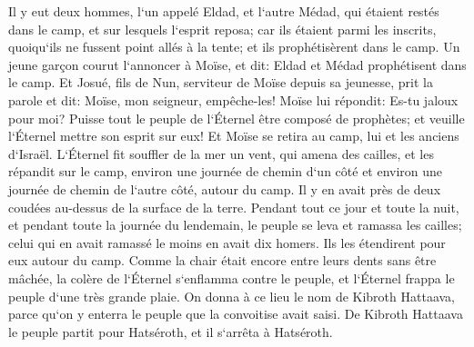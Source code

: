 \verse Il y eut deux hommes, l`un appelé Eldad, et l`autre Médad, qui étaient restés dans le camp, et sur lesquels l`esprit reposa; car ils étaient parmi les inscrits, quoiqu`ils ne fussent point allés à la tente; et ils prophétisèrent dans le camp. 
\verse Un jeune garçon courut l`annoncer à Moïse, et dit: Eldad et Médad prophétisent dans le camp. 
\verse Et Josué, fils de Nun, serviteur de Moïse depuis sa jeunesse, prit la parole et dit: Moïse, mon seigneur, empêche-les! 
\verse Moïse lui répondit: Es-tu jaloux pour moi? Puisse tout le peuple de l`Éternel être composé de prophètes; et veuille l`Éternel mettre son esprit sur eux! 
\verse Et Moïse se retira au camp, lui et les anciens d`Israël. 
\verse L`Éternel fit souffler de la mer un vent, qui amena des cailles, et les répandit sur le camp, environ une journée de chemin d`un côté et environ une journée de chemin de l`autre côté, autour du camp. Il y en avait près de deux coudées au-dessus de la surface de la terre. 
\verse Pendant tout ce jour et toute la nuit, et pendant toute la journée du lendemain, le peuple se leva et ramassa les cailles; celui qui en avait ramassé le moins en avait dix homers. Ils les étendirent pour eux autour du camp. 
\verse Comme la chair était encore entre leurs dents sans être mâchée, la colère de l`Éternel s`enflamma contre le peuple, et l`Éternel frappa le peuple d`une très grande plaie. 
\verse On donna à ce lieu le nom de Kibroth Hattaava, parce qu`on y enterra le peuple que la convoitise avait saisi. 
\verse De Kibroth Hattaava le peuple partit pour Hatséroth, et il s`arrêta à Hatséroth. 

